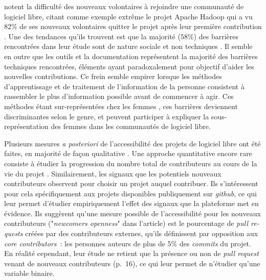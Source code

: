 \documentclass[dvipsnames,runningheads]{llncs}
\newcommand{\en}[1]{\foreignlanguage{english}{\emph{#1}}}
\begin{document}
    \textcite{barriers-2018} notent la difficulté des nouveaux volontaires à rejoindre une communauté de
    logiciel libre, citant comme exemple extrême le projet Apache Hadoop qui a vu 82\% de ses nouveaux
    volontaires quitter le projet après leur première contribution \parencite{hadoop-dropout-2013}. Une des
    tendances qu'ils trouvent est que la majorité ($58\%$) des barrières rencontrées dans leur étude sont de
    nature sociale et non techniques \parencite[p.~1008]{barriers-2018}. Il semble en outre que les outils et
    la documentation représentent la majorité des barrières techniques rencontrées, éléments ayant
    paradoxalement pour objectif d'aider les nouvelles contributions. Ce frein semble empirer lorsque les
    méthodes d'apprentissage et de traitement de l'information de la personne consistent à rassembler le plus
    d'information possible avant de commencer à agir. Ces méthodes étant sur-représentées chez les femmes
    \parencite{gender-information-processing-1995,gender-information-processing-2015}, ces barrières
    deviennent discriminantes selon le genre, et peuvent participer à expliquer la sous-représentation des
    femmes dans les communautés de logiciel libre.

    \label{sec:accessibility-measure}
    Plusieurs mesures \emph{a posteriori} de l'accessibilité des projets de logiciel libre ont été faites, en
    majorité de façon qualitative \parencites{newcomers-accessibility-2016}{newcomers-onboarding-2018}[voir
    aussi][]{newcomers-adaptation-2005}. Une approche quantitative encore rare consiste à étudier la
    progression du nombre total de contributeurs au cours de la vie du projet \cite{contributor-count-2006}.
    Similairement, \textcite{signals-2019} les signaux que les potentiels nouveaux contributeurs observent
    pour choisir un projet auquel contribuer. Ils s'intéressent pour cela spécifiquement aux projets
    disponibles publiquement sur \en{github}, ce qui leur permet d'étudier empiriquement l'effet des signaux
    que la plateforme met en évidence. Ils suggèrent qu'une mesure possible de l'accessibilité pour les
    nouveaux contributeurs ("\en{newcomers openness}" dans l'article) est le pourcentage de \en{pull requests}
    créées par des contributeurs externes, qu'ils définissent par opposition aux \en{core contributors} : les
    personnes auteurs de plus de 5\% des \en{commits} du projet. En réalité cependant, leur étude ne retient
    que la présence ou non de \en{pull request} venant de nouveaux contributeurs (p.~16), ce qui leur permet
    de n'étudier qu'une variable binaire.
\end{document}

